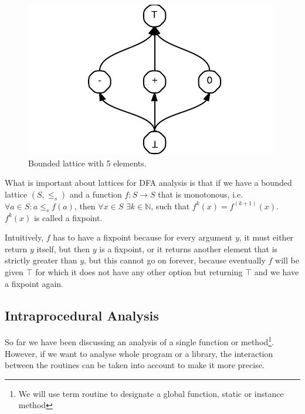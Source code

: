 \begin{figure}[h]  
  \centering
    \includegraphics{img/lattice.pdf}
  \caption{Bounded lattice with 5 elements.\label{lattice}}    
\end{figure}

        What is important about lattices for 
        DFA analysis is that if we have a 
        bounded lattice $(S, \leq_{s})$ and a function 
        $f:S\rightarrow{S}$ that is monotonous, 
        i.e. $\forall{a\in{S}}: a\leq_s{f(a)}$, then 
        $\forall{x\in{S}}$ $\exists{k\in\mathbb{N}}$, such that 
        $f^k(x)=f^{(k+1)}(x)$. $f^k(x)$ is called a fixpoint.
        
        Intuitively, $f$ has to have a fixpoint because 
        for every argument $y$, it must either return 
        $y$ itself, but then $y$ is a fixpoint, or it 
        returns another element that is strictly 
        greater than $y$, 
        but this cannot go on forever, because eventually 
        $f$ will be given $\top$ for which it does not have 
        any other option but returning $\top$ and we 
        have a fixpoint again.
        
        
        \paragraph*{}

        \subsection{Intraprocedural Analysis}
        So far we have been discussing an analysis of a 
        single function or method\footnote{We will use term 
        routine to designate a global function, static or instance method}. 
        However, if we want to analyse whole program or 
        a library, the interaction between the routines 
        can be taken into account to make it more precise.
        
